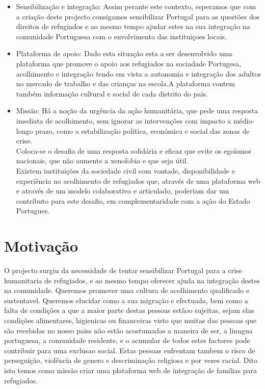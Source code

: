 \documentclass{article}
\begin{document}
\begin{itemize}
    \item Sensibilização e integração: Assim perante este contexto, esperamos que com a criação deste projecto consigamos sensibilizar Portugal para as questões dos direitos de refugiados e ao mesmo tempo ajudar estes na sua integração na comunidade Portuguesa com o envolvimento das instituiçoes locais.
    \item Plataforma de apoio: Dado esta situação esta a ser desenvolvido uma plataforma que promove o apoio aos refugiados na sociadade Portugesa, acolhimento e integração tendo em vista a autonomia e integração dos adultos no mercado de trabalho e das crianças na escola.A plataforma contem também informação cultural e social de cada distrito do pais. 
    \item Missão: Há a noção da urgência da ação humanitária, que pede uma resposta imediata de acolhimento, sem ignorar as intervenções com impacto a médio-longo prazo, como a estabilização política, económica e social das zonas de crise.\\Coloca-se o desafio de uma resposta  solidária e eficaz que evite os egoísmos nacionais, que não aumente a xenofobia e que seja útil.\\Existem instituições da sociedade civil com vontade, disponibilidade e experiência no acolhimento de refugiados que, através de uma plataforma web e através de um modelo colaborativo e articulado, poderiam dar um contributo para este desafio, em complementaridade com a ação do Estado Portugues. 


\end{itemize}

\section{Motivação}
O projecto surgiu da necessidade de tentar sensibilizar
Portugal para a crise humanitaria de refugiados, e ao mesmo
tempo oferecer ajuda na integração destes na comunidade.
Queremos promover uma cultura de acolhimento qualificado
e sustentavel. Queremos elucidar como a sua migração e
efectuada, bem como a falta de condições a que a maior
parte destas pessoas estãoo sujeitas, sejam elas condições alimentares,
higienicas ou financeiras visto que muitas das pessoas
que são recebidas no nosso paiss não estão acostumadas
a maneira de ser, a linngua portuguesa, a comunidade residente,
e o acumular de todos estes factores pode contribuir
para uma exclusao social. Estas pessoas enfrentam tambem
o risco de perseguição, violência de genero e descriminação
religiosa e por vezes racial.
Dito isto temos como missão criar uma plataforma web de
integração de familias para refugiados.
\end{document}
